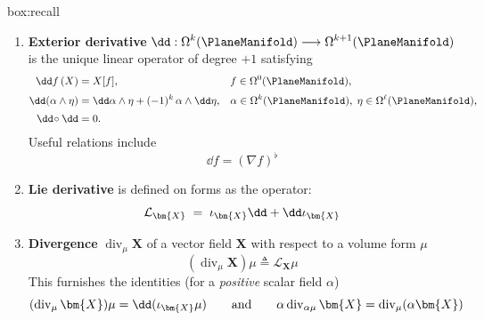 \begin{ambox}{box:recall}
\begin{enumerate}
\item \textbf{Exterior derivative} 
$\displaystyle 
\dd : \Omega^{k} (\PlaneManifold)\longrightarrow\Omega^{k+1} (\PlaneManifold)
$
is the unique linear operator of degree \(+1\) satisfying  
\[
\begin{aligned}
\dd f\,(X)                &= X[f], && f\in\Omega^{0} (\PlaneManifold), \\[2pt]
\dd(\alpha\wedge \eta)    &= \dd\alpha\wedge \eta + (-1)^{k}\,\alpha\wedge\dd \eta,
&& \alpha\in\Omega^{k} (\PlaneManifold),\; \eta\in\Omega^{\ell} (\PlaneManifold), \\[2pt]
\dd\!\circ\dd             &= 0.
\end{aligned}
\]
Useful relations include 
\begin{equation}
    \dd f = (\nabla f)^{\flat}
    \label{eq:ident-ext-d}
\end{equation}
%
%
\item \textbf{Lie derivative} is defined on forms as the operator:
\begin{equation}
\mathcal{L}_{\bm{X}} \;=\;\interior{\bm{X}}{\dd} + \dd\interior{\bm{X}}{}
\label{eq:def-lie-form}
\end{equation}
\item \textbf{Divergence} 
\(\operatorname{div}_{\mu}\bm{X}\)
of a vector field \(\bm{X}\) with respect to a volume form \(\mu\)
\begin{equation}
(\operatorname{div}_{\mu}\bm{X})\mu \triangleq \mathcal{L}_{\bm{X}}\mu
\label{eq:def-div}
\end{equation}
This furnishes the identities (for a \emph{positive} scalar field \(\alpha\))
\[
(\operatorname{div}_{\mu}\bm{X})\mu = \dd (\interior{\bm{X}}{\mu})
\qquad\text{and}\qquad
\alpha \operatorname{div}_{\alpha \mu} \bm{X} = \operatorname{div}_{\mu}(\alpha \bm{X})
\]
\end{enumerate}


\end{ambox}
